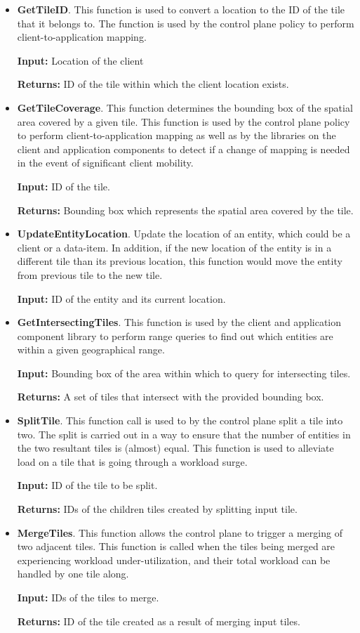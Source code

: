\begin{itemize}
\item \textbf{GetTileID}. This function is used to convert a location to the ID of the tile that it belongs to. The function is used by the control plane policy to perform client-to-application mapping.
\par \noindent \textbf{Input:} Location of the client
\par \noindent \textbf{Returns: }ID of the tile within which the client location exists.
\item \textbf{GetTileCoverage}. This function determines the bounding box of the spatial area covered by a given tile. This function is used by the control plane policy to perform client-to-application mapping as well as by the libraries on the client and application components to detect if a change of mapping is needed in the event of significant client mobility. 
\par \noindent \textbf{Input: }ID of the tile.
\par \noindent \textbf{Returns: }Bounding box which represents the spatial area covered by the tile.
\item \textbf{UpdateEntityLocation}. Update the location of an entity, which could be a client or a data-item. In addition, if the new location of the entity is in a different tile than its previous location, this function would move the entity from previous tile to the new tile. 
\par \noindent \textbf{Input: }ID of the entity and its current location.
\item \textbf{GetIntersectingTiles}. This function is used by the client and application component library to perform range queries to find out which entities are within a given geographical  range. 
\par \noindent \textbf{Input: } Bounding box of the area within which to query for intersecting tiles.
\par \noindent \textbf{Returns: } A set of tiles that intersect with the provided bounding box.
\item \textbf{SplitTile}. This function call is used to by the control plane split a tile into two. The split is carried out in a way to ensure that the number of entities in the two resultant tiles is (almost) equal. This function is used to alleviate load on a tile that is going through a workload surge.
\par \noindent \textbf{Input: } ID of the tile to be split.
\par \noindent \textbf{Returns: } IDs of the children tiles created by splitting input tile.
\item \textbf{MergeTiles}. This function allows the control plane to trigger a merging of two adjacent tiles. This function is called when the tiles being merged are experiencing workload under-utilization, and their total workload can be handled by one tile along.
\par \noindent \textbf{Input: } IDs of the tiles to merge.
\par \noindent \textbf{Returns: } ID of the tile created as a result of merging input tiles.
\end{itemize}

